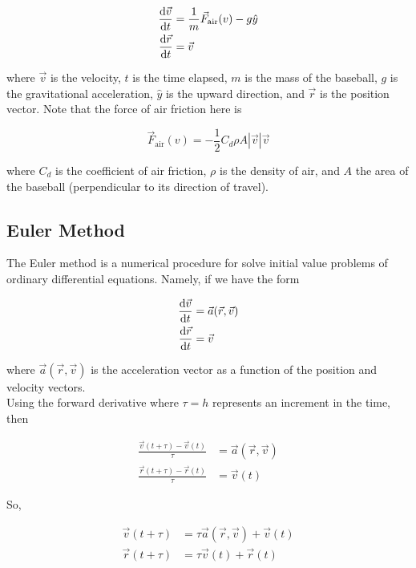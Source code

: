 \documentclass[]{article}
\begin{document}
\begin{align}
	\dv{\vec{v}}{t} &= \frac{1}{m}\vec{F}_{\text{air}}(v) - g\hat{y}\\
	\dv{\vec{r}}{t} &= \vec{v}
\end{align}

where $\vec{v}$ is the velocity, $t$ is the time elapsed, $m$ is the mass of the baseball, $g$ is the gravitational acceleration, $\hat{y}$ is the upward direction, and $\vec{r}$ is the position vector. Note that the force of air friction here is 

\begin{equation}
	\vec{F}_{\text{air}}(v) = -\frac{1}{2} C_d \rho A |\vec{v}|\vec{v}
\end{equation}

where $C_d$ is the coefficient of air friction, $\rho$ is the density of air, and $A$ the area of the baseball (perpendicular to its direction of travel).

\subsection{Euler Method}\bigbreak

The Euler method is a numerical procedure for solve initial value problems of ordinary differential equations. Namely, if we have the form

\begin{align*}
	\dv{\vec{v}}{t} &= \vec{a}(\vec{r}, \vec{v})\\
	\dv{\vec{r}}{t} &= \vec{v}
\end{align*}

where $\vec{a}(\vec{r}, \vec{v})$ is the acceleration vector as a function of the position and velocity vectors.\\

Using the forward derivative where $\tau = h$ represents an increment in the time, then

\begin{align*}
	\frac{\vec{v}(t + \tau)-\vec{v}(t)}{\tau} &= \vec{a}(\vec{r}, \vec{v})\\
	\frac{\vec{r}(t + \tau)-\vec{r}(t)}{\tau} &= \vec{v}(t)
\end{align*}

So, 

\begin{align*}
	\vec{v}(t + \tau) &= \tau\vec{a}(\vec{r}, \vec{v}) + \vec{v}(t)\\
	\vec{r}(t + \tau) &= \tau\vec{v}(t) + \vec{r}(t)
\end{align*}
\end{document}

